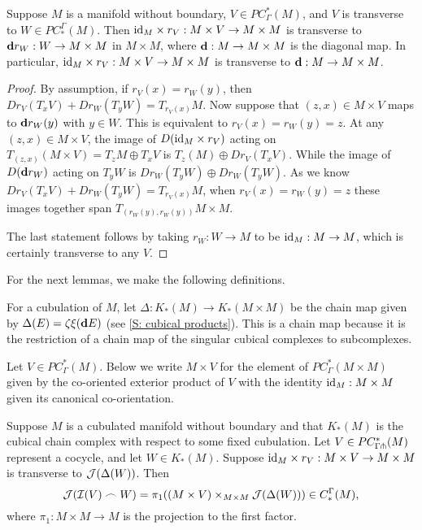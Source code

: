 \begin{lemma}\label{L: M times transverse diag}
Suppose $M$ is a manifold without boundary, $V\in PC^*_{\Gamma}(M)$, and $V$ is transverse to $W\in PC_*^\Gamma(M)$. Then $\mathrm{id}_M\times r_V:M\times V\to M\times M$ is transverse to $\mathbf{d} r_W:W\to M\times M$ in $M\times M$, where $\mathbf{d}:M\to M\times M$ is the diagonal map. In particular, $\mathrm{id}_M\times r_V:M\times V\to M\times M$ is transverse to $\mathbf{d}:M\to M\times M$.
\end{lemma}
\begin{proof}
By assumption, if $r_V(x)=r_W(y)$, then $Dr_V(T_xV)+Dr_W(T_yW)=T_{r_V(x)}M$. Now suppose that $(z,x)\in M\times V$ maps to $\mathbf{d} r_W(y)$ with $y\in W$. This is equivalent to $r_V(x)=r_W(y)=z$. At any $(z,x)\in M\times V$, the image of $D(\mathrm{id}_M\times r_V)$ acting on $T_{(z,x)}(M\times V)=T_zM\oplus T_xV$ is $T_z(M)\oplus Dr_V(T_xV)$. While the image of $D(\mathbf{d} r_W)$ acting on $T_yW$ is $Dr_W(T_yW)\oplus Dr_W(T_yW)$. As we know  $Dr_V(T_xV)+Dr_W(T_yW)=T_{r_V(x)}M$, when $r_V(x)=r_W(y)=z$ these images together span $T_{(r_W(y),r_W(y))}M\times M$.

The last statement follows by taking $r_W:W\to M$ to be $\mathrm{id}_M:M\to M$, which is certainly transverse to any $V$.
\end{proof}

For the next lemmas, we make the following definitions.

\begin{definition}
For a cubulation of $M$, let $\Delta:K_*(M)\to K_*(M\times M)$ be the chain map given by $\Delta(E)=\zeta\xi(\mathbf{d} E)$ (see \cref{S: cubical products}). This is a chain map because it is the restriction of a chain map of the singular cubical complexes to subcomplexes.
\end{definition}

\begin{definition}
Let $V\in PC^*_\Gamma(M)$. Below we write $M\times V$ for the element of $PC^*_\Gamma(M\times M)$ given by the co-oriented exterior product of $V$ with the identity $\mathrm{id}_M:M\times M$ given its canonical co-orientation.
\end{definition}


\begin{lemma}\label{L: image of cubical cap}
Suppose $M$ is a cubulated manifold without boundary and that $K_*(M)$ is the cubical chain complex with respect to some fixed cubulation.  Let $V\in PC^*_{\Gamma\pitchfork}(M)$ represent a cocycle, and let $W\in K_*(M)$. Suppose $\mathrm{id}_M\times r_V:M\times V\to M\times M$ is transverse to $\mathcal{J}(\Delta(W))$.  Then  $$\mathcal{J}(\mathcal{I}(V)\frown W)=\pi_1( (M\times V)\times_{M\times M}\mathcal{J}(\Delta(W)))\in C_*^\Gamma(M),$$
where $\pi_1:M\times M\to M$ is the projection to the first factor.
\end{lemma}

